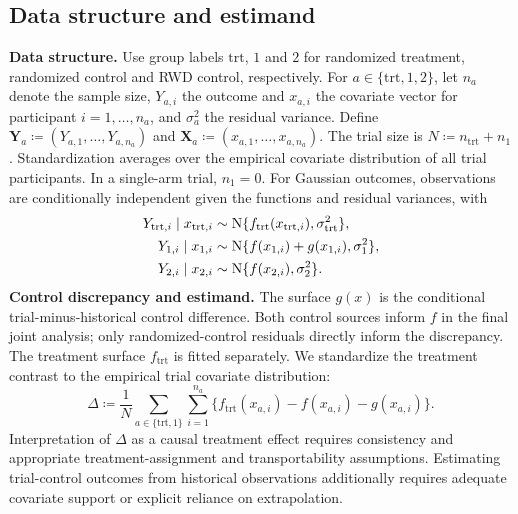 \documentclass[11pt]{article}
\begin{document}
\subsection{Data structure and estimand}
\noindent\textbf{Data structure.}
Use group labels $\mathrm{trt}$, $1$ and $2$ for randomized treatment, randomized control and RWD control, respectively. For $a\in\{\mathrm{trt},1,2\}$, let $n_a$ denote the sample size, $Y_{a,i}$ the outcome and $x_{a,i}$ the covariate vector for participant $i=1,\ldots,n_a$, and $\sigma_a^2$ the residual variance. Define $\mathbf{Y}_a\coloneqq(Y_{a,1},\ldots,Y_{a,n_a})$ and $\mathbf{X}_a\coloneqq(x_{a,1},\ldots,x_{a,n_a})$. The trial size is $N\coloneqq n_{\mathrm{trt}}+n_1$. Standardization averages over the empirical covariate distribution of all trial participants. In a single-arm trial, $n_1=0$. For Gaussian outcomes, observations are conditionally independent given the functions and residual variances, with
\begin{equation}\label{eq:model}
\begin{aligned}
Y_{\mathrm{trt},i}\mid x_{\mathrm{trt},i}&\sim\mathrm{N}\{f_{\mathrm{trt}}(x_{\mathrm{trt},i}),\sigma_{\mathrm{trt}}^2\},\\
Y_{1,i}\mid x_{1,i}&\sim\mathrm{N}\{f(x_{1,i})+g(x_{1,i}),\sigma_1^2\},\\
Y_{2,i}\mid x_{2,i}&\sim\mathrm{N}\{f(x_{2,i}),\sigma_2^2\}.
\end{aligned}
\end{equation}
\noindent\textbf{Control discrepancy and estimand.}
The surface $g(x)$ is the conditional trial-minus-historical control difference. Both control sources inform $f$ in the final joint analysis; only randomized-control residuals directly inform the discrepancy. The treatment surface $f_{\mathrm{trt}}$ is fitted separately. We standardize the treatment contrast to the empirical trial covariate distribution:
\begin{equation}\label{eq:contrast}
\Delta\coloneqq \frac1N\sum_{a\in\{\mathrm{trt},1\}}\sum_{i=1}^{n_a}\{f_{\mathrm{trt}}(x_{a,i})-f(x_{a,i})-g(x_{a,i})\}.
\end{equation}
Interpretation of $\Delta$ as a causal treatment effect requires consistency and appropriate treatment-assignment and transportability assumptions. Estimating trial-control outcomes from historical observations additionally requires adequate covariate support or explicit reliance on extrapolation.
\end{document}
